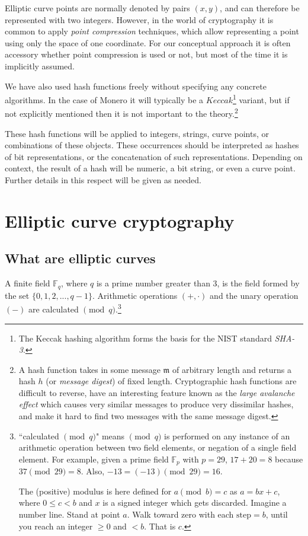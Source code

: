 Elliptic curve points are normally denoted by pairs \((x, y)\), and can therefore be represented with two integers. However, in the world of cryptography it is common to apply {\em point compression} techniques, which allow representing a point using only the space of one coordinate. For our conceptual approach it is often accessory whether point compression is used or not, but most of the time it is implicitly assumed.

We have also used hash functions freely without specifying any concrete algorithms. In the case of Monero it will typically be a \(\mathit{Keccak}\)\footnote{\label{kekkak_note}The Keccak hashing algorithm forms the basis
for the NIST standard {\em SHA-3}.} 
variant, but if not explicitly mentioned then it is not important to the theory.\footnote{\label{hash_note}A hash function takes in some message $\mathfrak{m}$ of arbitrary length and returns a hash $h$ (or {\em message digest}) of fixed length. Cryptographic hash functions are difficult to reverse, have an interesting feature known as the {\em large avalanche effect} which causes very similar messages to produce very dissimilar hashes, and make it hard to find two messages with the same message digest.}

These hash functions will be applied to integers, strings, curve points, or combinations of these objects. These occurrences should be interpreted as hashes of bit representations, or the concatenation of such representations. Depending on context, the result of a hash will be numeric, a bit string, or even a curve point. Further details in this respect will be given as needed.




\section{Elliptic curve cryptography}
\label{EllipticCurveCryptography}

\subsection{What are elliptic curves}
\label{elliptic_curves_section}


A finite field \(\mathbb{F}_q\), where \(q\) is a prime number greater than 3, is the field formed by the set \(\{0, 1, 2, ..., q-1\}\). Arithmetic operations \((+,  \cdot)\) and the unary operation $(-)$ are calculated \( \pmod q\).\footnote{\label{modulus_note}``calculated \( \pmod q\)" means \( \pmod q\) is performed on any instance of an arithmetic operation between two field elements, or negation of a single field element. For example, given a prime field \(\mathbb{F}_p\) with $p = 29$, $17+20=8$ because $37 \pmod{29} = 8$. Also, $-13 = (-13) \pmod{29} = 16$.

The (positive) modulus is here defined for $a \pmod b = c$ as $a=bx+c$, where $0\leq{c}<{b}$ and $x$ is a signed integer which gets discarded. Imagine a number line. Stand at point $a$. Walk toward zero with each $\text{step} =b$, until you reach an integer $\geq{0}$ and $<b$. That is $c$.}


